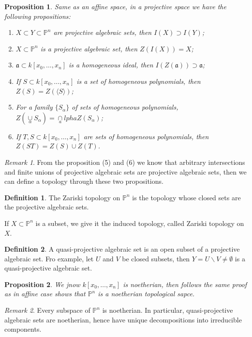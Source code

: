 \documentclass{amsart}
\theoremstyle{plain}
\newtheorem{proposition}{Proposition}
\theoremstyle{definition}
\newtheorem{definition}{Definition}
\theoremstyle{remark}
\newtheorem*{remark}{Remark}
\numberwithin{equation}{section}
\begin{document}
\begin{proposition}
	Same as an affine space, in a projective space we have the following propositions:
\begin{enumerate}
		\item $ X\subset Y\subset \mathbb{P}^n $ are projective algebraic sets, then
		$ I(X)\supset I(Y) $;
		\item $ X\subset \mathbb{P}^n $ is a projective algebraic set, then $ Z(I(X))=X $;
		\item $ \mathfrak{a}\subset k[x_0,\dots,x_n] $ is a homogeneous ideal, then $ I(Z(\mathfrak{a}))\supset \mathfrak{a} $;
		\item If $ S\subset k[x_0,\dots,x_n] $ is a set of homogeneous polynomials, then $ Z(S)=Z(\langle S \rangle ) $;
		\item For a family $ \{ S_\alpha \} $ of sets of homogeneous polynomials, $ Z(\mathop{\cup}\limits_\alpha S_\alpha) = \mathop{\cap}\limits_alpha Z(S_\alpha)$;
		\item If $ T,S\subset k[x_0,\dots,x_n] $ are sets of homogeneous polynomials, then $ Z(ST)=Z(S)\cup Z(T) $.
	\end{enumerate}
\end{proposition}
\begin{remark}
	From the proposition (5) and (6) we know that arbitrary intersections and finite unions  of projective algebraic sets are projective algebraic sets, then we can define a topology through these two propositions.
\end{remark}
\begin{definition}
	The Zariski topology on $ \mathbb{P}^n $ is the topology whose closed sets are the projective algebraic sets.

	If $ X\subset \mathbb{P}^n $ is a subset, we give it the induced topology, called Zariski topology on $ X $.
\end{definition}
\begin{definition}
	A quasi-projective algebraic set is an open subset of a projective algebraic set. Fro example, let $ U $ and $ V $ be closed subsets, then $ Y=U\backslash V\neq \emptyset $ is a quasi-projective algebraic set.
\end{definition}
\begin{proposition}
	We jnow $ k[x_0,\dots,x_n] $ is noetherian, then follows the same proof as in affine case shows that $ \mathbb{P}^n $ is a noetherian topological sapce.
\end{proposition}
\begin{remark}
	Every subspace of $ \mathbb{P}^n $ is noetherian. In particular, quasi-projective algebraic sets are noetherian, hence have unique decompositions into irreducible components.
\end{remark}
\end{document}
